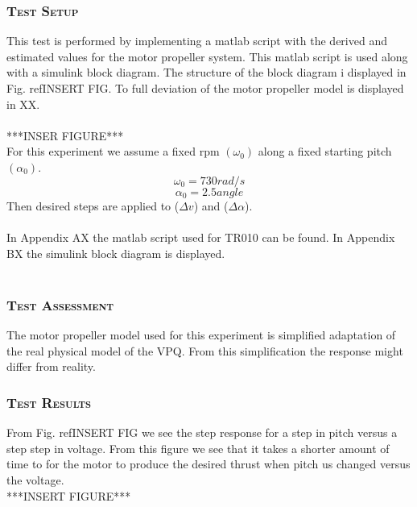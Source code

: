 \subsubsection*{\textsc{\medium Test Setup}}
This test is performed by implementing a matlab script with the derived and estimated values for the motor propeller system. This matlab script is used along with a simulink block diagram. The structure of the block diagram i displayed in Fig. ref{INSERT FIG}. To full deviation of the motor propeller model is displayed in XX.\\
\\
***INSER FIGURE***
\\
For this experiment we assume a fixed rpm $(\omega_0)$ along a fixed starting pitch  $(\alpha_0)$. 
$$\omega_0 = 730 rad/s$$
$$\alpha_0 = 2.5 angle$$
Then desired steps are applied to ($\Delta v$) and ($\Delta \alpha$).\\
\\
In Appendix AX the matlab script used for TR010 can be found. In Appendix BX the simulink block diagram is displayed.\\
\\

\subsubsection*{\textsc{\medium Test Assessment}}
The motor propeller model used for this experiment is simplified adaptation of the real physical model of the VPQ. From this simplification the response might differ from reality. 

\subsubsection*{\textsc{\medium Test Results}}
From Fig. ref{INSERT FIG} we see the step response for a step in pitch versus a step step in voltage. From this figure we see that it takes a shorter amount of time to for the motor to produce the desired thrust when pitch us changed versus the voltage.
\\
***INSERT FIGURE***
\\


\newpage


